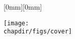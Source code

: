 \begin{titlepages}
%
\thispagestyle{empty}
\raisebox{0mm}[0mm][0mm]{%
\parbox{8.5in}{
\vspace*{236mm}\hspace{-38.5mm}\texttt{[image: \\chapdir/figs/cover]}\\
}
}%
\\


\end{titlepages}

\begin{titlepages}[2]
  \brieftitle
\end{titlepages}

\begin{titlepages}
\end{titlepages}

\normalsize\normalfont\pagebreak\thispagestyle{empty}\cleardoublepage\thispagestyle{empty}
